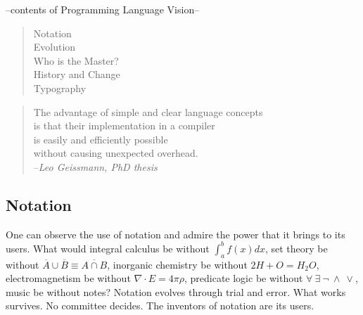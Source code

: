 





\begin{center}
\begin{small}
\noindent --contents of Programming Language Vision--
\begin{quote}
\raggedright
Notation\\
Evolution\\
Who is the Master?\\
History and Change\\
Typography\\
\end{quote}
\end{small}
\end{center}

\vspace{1em}


\vspace{1em}

\begin{quote} \raggedleft
The advantage of simple and clear language concepts 			\\
is that their implementation in a compiler				\\
is easily and efficiently possible					\\
without causing unexpected overhead.					\\
--{\em Leo Geissmann, PhD thesis}
\end{quote}

\subsection{Notation}

One can observe the use of notation and admire the power that it
brings to its users.  What would integral calculus be without
$\int_{a}^{b} f(x)dx$, set theory be without
$\overline{A}\cup\overline{B}\equiv \overline{A\cap B}$, inorganic
chemistry be without $2H+O=H_{2}O$, electromagnetism be without
$\nabla\cdot E = 4\pi\rho$, predicate logic be without
$\forall\ \exists\ \neg\ \wedge\ \vee$, music be
without notes?  Notation evolves through trial and error.  What works
survives.  No committee decides.  The inventors of notation are its
users.

